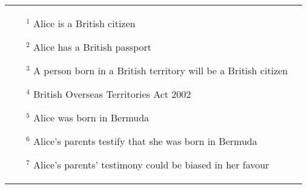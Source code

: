 \begin{tabular}{l l}
\begin{minipage}{0.5\textwidth}
\begin{enumerate}
	\item[$^1$] \footnotesize{Alice is a British citizen}
	\item[$^2$] \footnotesize{Alice has a British passport}
	\item[$^3$] \footnotesize{A person born in a British territory will be a British citizen}
	\item[$^4$] \footnotesize{British Overseas Territories Act 2002}
\end{enumerate}
\end{minipage}

\begin{minipage}{0.5\textwidth}
\begin{enumerate}
	\item[$^5$] \footnotesize{Alice was born in Bermuda}
	\item[$^6$] \footnotesize{Alice's parents testify that she was born in Bermuda}
	\item[$^7$] \footnotesize{Alice's parents' testimony could be biased in her favour}
\end{enumerate}
\end{minipage}
\end{tabular}